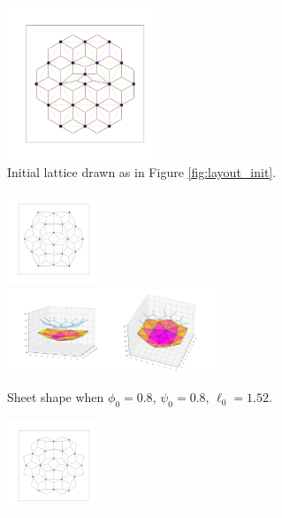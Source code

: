 \begin{figure}[htbp]
    \centering
    \begin{subfigure}[b]{\textwidth}
        \centering
        \includegraphics[width=0.5\textwidth]{bump/bump_graph.png}
        \caption{Initial lattice drawn as in Figure \ref{fig:layout_init}.}
        \label{subfig:bump_graph}
    \end{subfigure}
    \begin{subfigure}[b]{\textwidth}
        \centering
        \includegraphics[width=0.3\textwidth]{bump/bump0.8_0.8_1.52_10_graph.png}
        \includegraphics[width=0.69\textwidth]{bump/bump0.8_0.8_1.52_10_plot.png}
        \caption{Sheet shape when $\phi_0=0.8$, $\psi_0=0.8$, $\ell_0=1.52$.}
        \label{subfig:bump_in}
    \end{subfigure}
    \begin{subfigure}[b]{\textwidth}
        \centering
        \includegraphics[width=0.3\textwidth]{bump/bump0.95_0.8_1.52_10_graph.png}

\end{subfigure}
\end{figure}
